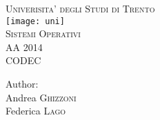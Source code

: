 \begin{titlepage}
\begin{center}

\vspace*{1cm}
        
\textsc{\LARGE Univerisita' degli Studi di Trento}\\[1.5cm] %
\texttt{[image: uni]}\\[1.5cm]
\textsc{\Large Sistemi Operativi}\\[0.5cm] %
\textsc{\large AA 2014}\\[0.5cm] %

\vspace{1.5cm}
\textsc{\LARGE CODEC}
\vspace{1.5cm}
        
\Large {Author:}\\
Andrea \textsc{Ghizzoni}\\
Federica \textsc{Lago}\\
        
\end{center}
\end{titlepage}